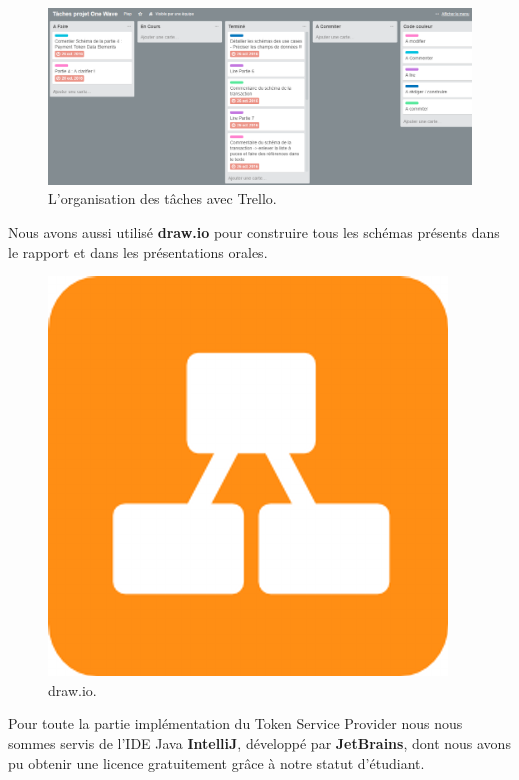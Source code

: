\documentclass{report}
\begin{document}
\begin{figure}[!ht]
    \centering
			\includegraphics[scale=0.46]{img/trello.PNG}
			\caption{\label{Trello} L'organisation des tâches avec Trello.}			
\end{figure}

\newpage
\noindent
Nous avons aussi utilisé \textbf{draw.io} pour construire tous les schémas présents dans le rapport et dans les présentations orales.

\begin{figure}[!ht]
    \centering
			\includegraphics[scale=0.2]{img/draw.png}
			\caption{\label{Draw} draw.io.}			
\end{figure}

\noindent
Pour toute la partie implémentation du Token Service Provider nous nous sommes servis de l'IDE Java \textbf{IntelliJ}, développé par \textbf{JetBrains}, dont nous avons pu obtenir une licence gratuitement grâce à notre statut d'étudiant.
\end{document}

